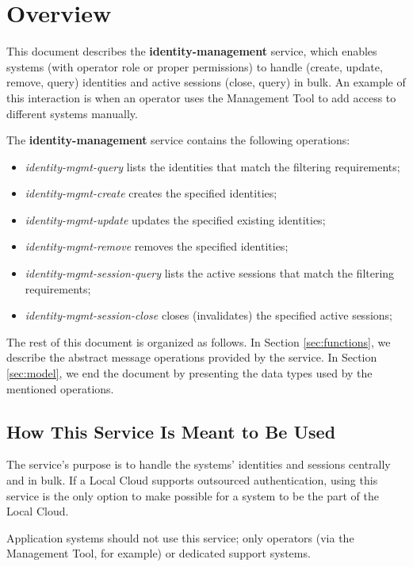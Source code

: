 \documentclass[a4paper]{arrowhead}
\begin{document}
\section{Overview}
\label{sec:overview}
This document describes the \textbf{identity-management} service, which enables systems (with operator role or proper permissions) to handle (create, update, remove, query) identities and active sessions (close, query) in bulk. An example of this interaction is when an operator uses the Management Tool to add access to different systems manually.

The \textbf{identity-management} service contains the following operations:

\begin{itemize}
    \item \textit{identity-mgmt-query} lists the identities that match the filtering requirements;
    \item \textit{identity-mgmt-create} creates the specified identities;
    \item \textit{identity-mgmt-update} updates the specified existing identities;
    \item \textit{identity-mgmt-remove} removes the specified identities;
    \item \textit{identity-mgmt-session-query} lists the active sessions that match the filtering requirements;
    \item \textit{identity-mgmt-session-close} closes (invalidates) the specified active sessions;
\end{itemize}

The rest of this document is organized as follows.
In Section \ref{sec:functions}, we describe the abstract message operations provided by the service.
In Section \ref{sec:model}, we end the document by presenting the data types used by the mentioned operations.

\subsection{How This Service Is Meant to Be Used}
The service's purpose is to handle the systems' identities and sessions centrally and in bulk. If a Local Cloud supports outsourced authentication, using this service is the only option to make possible for a system to be the part of the Local Cloud.

Application systems should not use this service; only operators (via the Management Tool, for example) or dedicated support systems.
\end{document}

